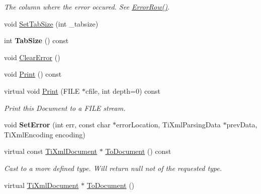 \begin{DoxyCompactItemize}
\begin{DoxyCompactList}\small\item\em The column where the error occured. See \hyperlink{class_ti_xml_document_af30efc75e804aa2e92fb8be3a8cb676e}{ErrorRow()}. \item\end{DoxyCompactList}\item 
void \hyperlink{class_ti_xml_document_a51dac56316f89b35bdb7d0d433ba988e}{SetTabSize} (int \_\-tabsize)
\item 
\hypertarget{class_ti_xml_document_a612360241b85bad0826b2a9ae9cda561}{
int {\bfseries TabSize} () const }
\label{class_ti_xml_document_a612360241b85bad0826b2a9ae9cda561}

\item 
void \hyperlink{class_ti_xml_document_ac66b8c28db86363315712a3574e87c35}{ClearError} ()
\item 
void \hyperlink{class_ti_xml_document_af08389ec70ee9b2de7f800e206a18510}{Print} () const 
\item 
\hypertarget{class_ti_xml_document_a8701fda1fa31b25abbc9c0df42da10e8}{
virtual void \hyperlink{class_ti_xml_document_a8701fda1fa31b25abbc9c0df42da10e8}{Print} (FILE $\ast$cfile, int depth=0) const }
\label{class_ti_xml_document_a8701fda1fa31b25abbc9c0df42da10e8}

\begin{DoxyCompactList}\small\item\em Print this Document to a FILE stream. \item\end{DoxyCompactList}\item 
\hypertarget{class_ti_xml_document_a735c23e318597b920c94eae77fa206de}{
void {\bfseries SetError} (int err, const char $\ast$errorLocation, TiXmlParsingData $\ast$prevData, TiXmlEncoding encoding)}
\label{class_ti_xml_document_a735c23e318597b920c94eae77fa206de}

\item 
\hypertarget{class_ti_xml_document_a1dc977bde3e4fe85a8eb9d88a35ef5a4}{
virtual const \hyperlink{class_ti_xml_document}{TiXmlDocument} $\ast$ \hyperlink{class_ti_xml_document_a1dc977bde3e4fe85a8eb9d88a35ef5a4}{ToDocument} () const }
\label{class_ti_xml_document_a1dc977bde3e4fe85a8eb9d88a35ef5a4}

\begin{DoxyCompactList}\small\item\em Cast to a more defined type. Will return null not of the requested type. \item\end{DoxyCompactList}\item 
\hypertarget{class_ti_xml_document_a1025d942a1f328fd742d545e37efdd42}{
virtual \hyperlink{class_ti_xml_document}{TiXmlDocument} $\ast$ \hyperlink{class_ti_xml_document_a1025d942a1f328fd742d545e37efdd42}{ToDocument} ()}
\label{class_ti_xml_document_a1025d942a1f328fd742d545e37efdd42}


\end{DoxyCompactItemize}
